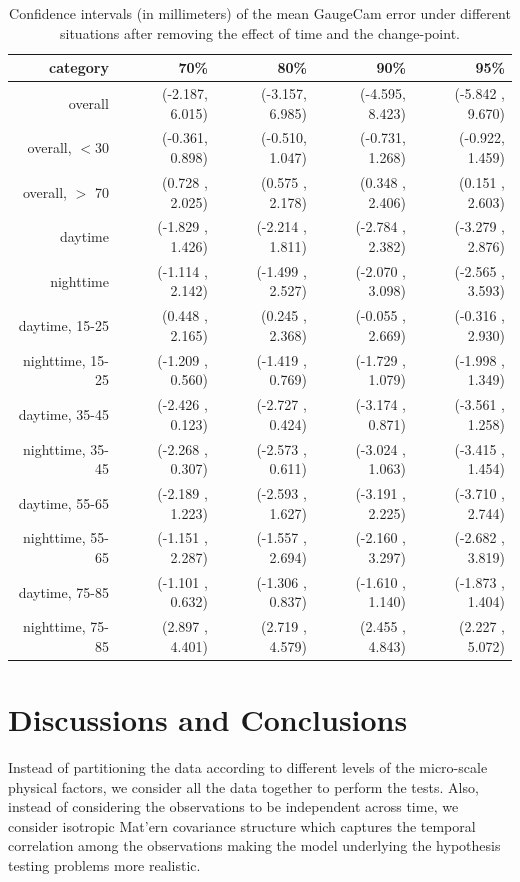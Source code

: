 \documentclass[]{article}
\begin{document}
\begin{table}[ht]
\centering
\begin{tabular}{rrrrr}
  \hline
category &  70\% & 80\% & 90\% & 95\% \\ 
  \hline
overall & (-2.187, 6.015) & (-3.157, 6.985) & (-4.595, 8.423) & (-5.842 , 9.670) \\ 
  overall, $<$30 & (-0.361, 0.898) & (-0.510, 1.047) & (-0.731, 1.268) & (-0.922, 1.459) \\ 
  overall, $>$ 70 & (0.728 , 2.025) & (0.575 , 2.178) & (0.348 , 2.406) & (0.151 , 2.603) \\ 
  daytime & (-1.829 , 1.426) & (-2.214 , 1.811) & (-2.784 , 2.382) & (-3.279 , 2.876) \\ 
  nighttime & (-1.114 , 2.142) & (-1.499 , 2.527) & (-2.070 , 3.098) & (-2.565 , 3.593) \\ 
  daytime, 15-25 & (0.448 , 2.165) & (0.245 , 2.368) & (-0.055 , 2.669) & (-0.316 , 2.930) \\ 
  nighttime, 15-25 & (-1.209 , 0.560) & (-1.419 , 0.769) & (-1.729 , 1.079) & (-1.998 , 1.349) \\ 
  daytime, 35-45 & (-2.426 , 0.123) & (-2.727 , 0.424) & (-3.174 , 0.871) & (-3.561 , 1.258) \\ 
  nighttime, 35-45 & (-2.268 , 0.307) & (-2.573 , 0.611) & (-3.024 , 1.063) & (-3.415 , 1.454) \\ 
  daytime, 55-65 & (-2.189 , 1.223) & (-2.593 , 1.627) & (-3.191 , 2.225) & (-3.710 , 2.744) \\ 
  nighttime, 55-65 & (-1.151 , 2.287) & (-1.557 , 2.694) & (-2.160 , 3.297) & (-2.682 , 3.819) \\ 
  daytime, 75-85 & (-1.101 , 0.632) & (-1.306 , 0.837) & (-1.610 , 1.140) & (-1.873 , 1.404) \\ 
  nighttime, 75-85 & (2.897 , 4.401) & (2.719 , 4.579) & (2.455 , 4.843) & (2.227 , 5.072) \\ 
   \hline
\end{tabular}
\caption{Confidence intervals (in millimeters) of the mean GaugeCam error under different situations after removing the effect of time and the change-point.}
\end{table}

\section{Discussions and Conclusions}

Instead of partitioning the data according to different levels of the micro-scale physical factors, we consider all the data together to perform the tests. Also, instead of considering the observations to be independent across time, we consider isotropic Mat'ern covariance structure which captures the temporal correlation among the observations making the model underlying the hypothesis testing problems more realistic.
\end{document}
